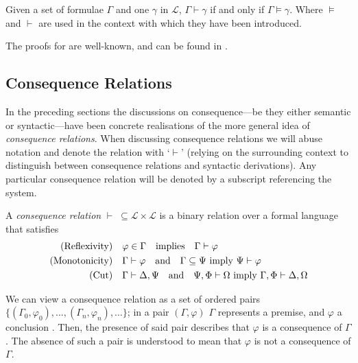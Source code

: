 \begin{definition}
  \label{definition:completeness-hilbert}  Given a set of formulae $\Gamma$ and one $\gamma$ in $\mathcal{L}$, $\Gamma \vdash \gamma$ if and only if
  $\Gamma \vDash \gamma$. Where $\vDash$ and $\vdash$ are used in the context with which they have been introduced.
\end{definition}

The proofs for  are well-known, and can be found in \cite[p. 64]{Ben1993Mathematical}.

\label{subsubsection:gentzen-systems} 

\subsection{Consequence Relations}
\label{subsection:consequence-relations} 

In the preceding sections the discussions on consequence---be they either semantic or syntactic---have been concrete realisations of the more general idea of \textit{consequence relations}. When discussing
consequence relations we will abuse notation and denote the relation with `$\vdash$' (relying on the surrounding context to distinguish between consequence relations and syntactic derivations). Any
particular consequence relation will be denoted by a subscript referencing the system.

\begin{definition}
  \label{definition:consequence-relations} A \textit{consequence relation} $\vdash \; \subseteq \mathcal{L}\times \mathcal{L}$ is a binary relation over a formal language that satisfies
  \begin{align}
    \text{(Reflexivity)}\quad  & \varphi \in \Gamma \quad \text{implies} \quad \Gamma \vdash \varphi                                                            \\
    \text{(Monotonicity)}\quad & \Gamma \vdash \varphi \quad \text{and} \quad \Gamma \subseteq \Psi \text{ imply }\Psi \vdash \varphi                        \\
    \text{(Cut)}\quad          & \Gamma \vdash \Delta, \Psi \quad \text{and} \quad \Psi, \Phi \vdash \Omega \text{ imply }\Gamma, \Phi \vdash \Delta, \Omega
  \end{align}
\end{definition}

We can view a consequence relation as a set of ordered pairs $\{(\Gamma_{0}, \varphi_{0}), \ldots, (\Gamma_{n}, \varphi_{n}), \ldots\}$; in a pair $(\Gamma, \varphi )$ $\Gamma$ represents a premise, and
$\varphi$ a conclusion \cite[p. 16]{citkin2022consequence}. Then, the presence of said pair describes that $\varphi$ is a consequence of $\Gamma$. The absence of such a pair is understood to mean that
$\varphi$ is not a consequence of $\Gamma$.

